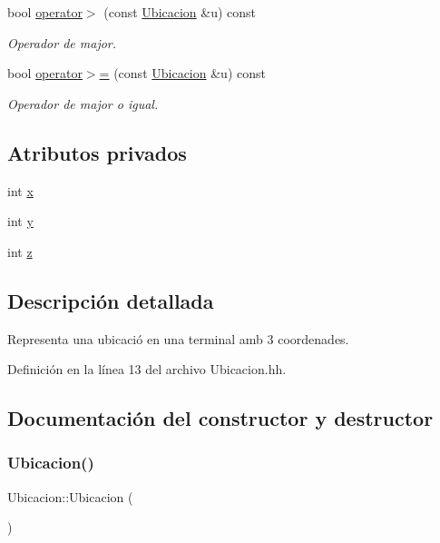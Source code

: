 \begin{DoxyCompactItemize}
bool \hyperlink{class_ubicacion_abde3b350c4f55f59964fabbc17ed164f}{operator$>$} (const \hyperlink{class_ubicacion}{Ubicacion} \&u) const
\begin{DoxyCompactList}\small\item\em Operador de major. \end{DoxyCompactList}\item 
bool \hyperlink{class_ubicacion_a0ea3b04b8b0ef5a3482049d3ddf63f3b}{operator$>$=} (const \hyperlink{class_ubicacion}{Ubicacion} \&u) const
\begin{DoxyCompactList}\small\item\em Operador de major o igual. \end{DoxyCompactList}\end{DoxyCompactItemize}
\subsection*{Atributos privados}
\begin{DoxyCompactItemize}
\item 
int \hyperlink{class_ubicacion_aa025967df0ca8761587b09a38cf5b798}{x}
\item 
int \hyperlink{class_ubicacion_ab314f05b8da651aabb8a623467919a94}{y}
\item 
int \hyperlink{class_ubicacion_ad74770f35bf4b18d3959b78cd90b6eb0}{z}
\end{DoxyCompactItemize}


\subsection{Descripción detallada}
Representa una ubicació en una terminal amb 3 coordenades. 

Definición en la línea 13 del archivo Ubicacion.\+hh.



\subsection{Documentación del constructor y destructor}
\mbox{\label{class_ubicacion_a9014ea9ce9297b951a07a668a5fb7cc4}} 
\subsubsection{\texorpdfstring{Ubicacion()}{Ubicacion()}\hspace{0.1cm}{\footnotesize\ttfamily [1/3]}}
{\footnotesize\ttfamily Ubicacion\+::\+Ubicacion (\begin{DoxyParamCaption}{ }\end{DoxyParamCaption})}



